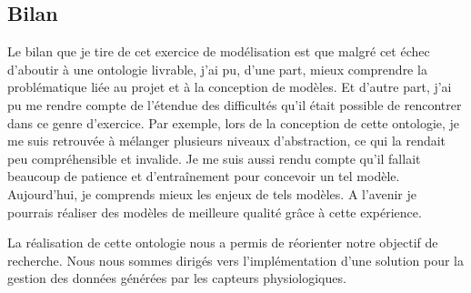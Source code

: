 \documentclass[11pt]{article}
\begin{document}
	\subsection{Bilan}\label{sec:modelbilan}
		Le bilan que je tire de cet exercice de modélisation est que malgré cet échec d'aboutir à une ontologie livrable, j'ai pu, d'une part, mieux comprendre la problématique liée au projet et à la conception de modèles.
		Et d'autre part, j'ai pu me rendre compte de l'étendue des difficultés qu'il  était possible de rencontrer dans ce genre d'exercice.
		Par exemple, lors de la conception de cette ontologie, je me suis retrouvée à mélanger plusieurs niveaux d'abstraction, ce qui la rendait peu compréhensible et invalide.
		Je me suis aussi rendu compte qu'il fallait beaucoup de patience et d'entraînement pour concevoir un tel modèle.
		Aujourd'hui, je comprends mieux les enjeux de tels modèles.
		A l'avenir je pourrais réaliser des modèles de meilleure qualité grâce à cette expérience.\par
		La réalisation de cette ontologie nous a permis de réorienter notre objectif de recherche.
		Nous nous sommes dirigés vers l'implémentation d'une solution pour la gestion des données générées par les capteurs physiologiques.
\end{document}
